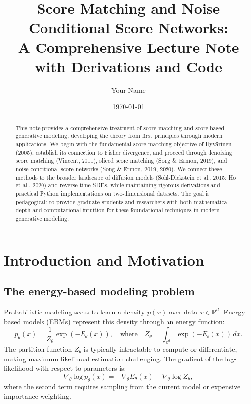 \documentclass[11pt]{article}
\title{Score Matching and Noise Conditional Score Networks:\\
A Comprehensive Lecture Note with Derivations and Code}
\author{Your Name}
\date{\today}
\theoremstyle{definition}
\begin{document}
\maketitle

\begin{abstract}
This note provides a comprehensive treatment of score matching and score-based generative modeling, 
developing the theory from first principles through modern applications. 
We begin with the fundamental score matching objective of Hyv\"arinen (2005), 
establish its connection to Fisher divergence, and proceed through denoising score matching (Vincent, 2011), 
sliced score matching (Song \& Ermon, 2019), and noise conditional score networks (Song \& Ermon, 2019, 2020). 
We connect these methods to the broader landscape of diffusion models (Sohl-Dickstein et al., 2015; Ho et al., 2020) 
and reverse-time SDEs, while maintaining rigorous derivations and practical Python implementations on two-dimensional datasets. 
The goal is pedagogical: to provide graduate students and researchers with both mathematical depth and computational intuition 
for these foundational techniques in modern generative modeling.
\end{abstract}

\tableofcontents

\section{Introduction and Motivation}

\subsection{The energy-based modeling problem}
Probabilistic modeling seeks to learn a density $p(x)$ over data $x \in \mathbb{R}^d$. 
Energy-based models (EBMs) represent this density through an energy function:
\begin{equation}
p_\theta(x) = \frac{1}{Z_\theta} \exp(-E_\theta(x)),
\quad \text{where} \quad
Z_\theta = \int_{\mathbb{R}^d} \exp(-E_\theta(x))\,dx.
\end{equation}
The partition function $Z_\theta$ is typically intractable to compute or differentiate, 
making maximum likelihood estimation challenging. 
The gradient of the log-likelihood with respect to parameters is:
\begin{equation}
\nabla_\theta \log p_\theta(x) = -\nabla_\theta E_\theta(x) - \nabla_\theta \log Z_\theta,
\end{equation}
where the second term requires sampling from the current model or expensive importance weighting.
\end{document}

